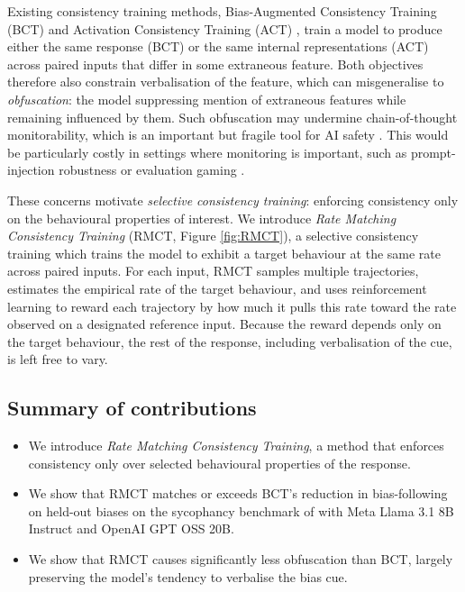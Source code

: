 \documentclass{article}
\begin{document}
Existing consistency training methods, Bias-Augmented Consistency Training (BCT) \citep{chua_bias-augmented_2024} and Activation Consistency Training (ACT) \citep{irpan_consistency_2025}, train a model to produce either the same response (BCT) or the same internal representations (ACT) across paired inputs that differ in some extraneous feature. Both objectives therefore also constrain verbalisation of the feature, which can misgeneralise to \emph{obfuscation}: the model suppressing mention of extraneous features while remaining influenced by them. Such obfuscation may undermine chain-of-thought monitorability, which is an important but fragile tool for AI safety \citep{korbak2025chain}. This would be particularly costly in settings where monitoring is important, such as prompt-injection robustness \citep{anthropic_prompt_injection_2025} or evaluation gaming \citep{schoen_stress_2025}.

These concerns motivate \emph{selective consistency training}: enforcing consistency only on the behavioural properties of interest. We introduce \emph{Rate Matching Consistency Training} (RMCT, Figure \ref{fig:RMCT}), a selective consistency training which trains the model to exhibit a target behaviour at the same rate across paired inputs. For each input, RMCT samples multiple trajectories, estimates the empirical rate of the target behaviour, and uses reinforcement learning to reward each trajectory by how much it pulls this rate toward the rate observed on a designated reference input. Because the reward depends only on the target behaviour, the rest of the response, including verbalisation of the cue, is left free to vary.

\subsection{Summary of contributions}
\begin{itemize}
    \item We introduce \emph{Rate Matching Consistency Training}, a method that enforces consistency only over selected behavioural properties of the response.
    \item We show that RMCT matches or exceeds BCT's reduction in bias-following on held-out biases on the sycophancy benchmark of \citet{chua_bias-augmented_2024} with Meta Llama 3.1 8B Instruct and OpenAI GPT OSS 20B.
    \item We show that RMCT causes significantly less obfuscation than BCT, largely preserving the model's tendency to verbalise the bias cue.
\end{itemize}
\end{document}
